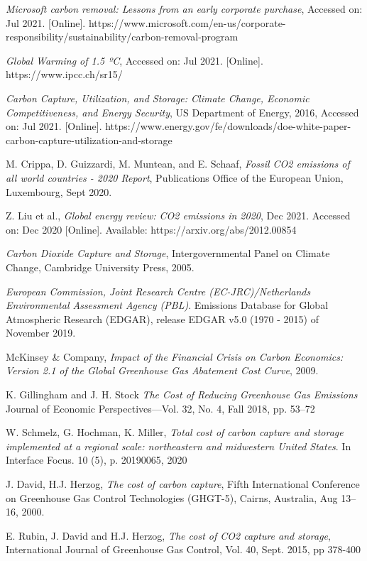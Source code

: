 \documentclass{article}
\begin{document}
\begin{thebibliography}{1}
  \textit{Microsoft carbon removal: Lessons from an early corporate purchase}, Accessed on: Jul 2021. [Online]. https://www.microsoft.com/en-us/corporate-responsibility/sustainability/carbon-removal-program

 \textit{Global Warming of 1.5 ºC}, Accessed on: Jul 2021. [Online]. https://www.ipcc.ch/sr15/

 \textit{Carbon Capture, Utilization, and Storage: Climate Change, Economic Competitiveness, and Energy Security}, US Department of Energy, 2016, Accessed on: Jul 2021. [Online]. https://www.energy.gov/fe/downloads/doe-white-paper-carbon-capture-utilization-and-storage

 M. Crippa, D. Guizzardi, M. Muntean, and E. Schaaf, \textit{Fossil CO2 emissions of all world countries - 2020 Report}, Publications Office of the European Union, Luxembourg, Sept 2020.

 Z. Liu et al.,  \textit{Global energy review: CO2 emissions in 2020}, Dec 2021. Accessed on: Dec 2020 [Online]. Available: https://arxiv.org/abs/2012.00854

 \textit{Carbon Dioxide Capture and Storage}, Intergovernmental Panel on Climate Change, Cambridge University Press, 2005.

 \textit{European Commission, Joint Research Centre (EC-JRC)/Netherlands Environmental Assessment Agency (PBL)}. Emissions Database for Global Atmospheric Research (EDGAR), release EDGAR v5.0 (1970 - 2015) of November 2019.

 McKinsey \& Company, \textit{Impact of the Financial Crisis on Carbon Economics: Version 2.1 of the Global Greenhouse Gas Abatement Cost Curve}, 2009. 

 K. Gillingham and J. H. Stock \textit{The Cost of Reducing Greenhouse Gas Emissions} Journal of Economic Perspectives—Vol. 32, No. 4, Fall 2018, pp. 53–72

 W. Schmelz, G. Hochman, K. Miller, \textit{Total cost of carbon capture and storage implemented at a regional scale: northeastern and midwestern United States}. In Interface Focus. 10 (5), p. 20190065, 2020

 J. David, H.J. Herzog, \textit{The cost of carbon capture}, Fifth International Conference on Greenhouse Gas Control Technologies (GHGT-5), Cairns, Australia, Aug 13–16, 2000.

 E. Rubin, J. David and  H.J. Herzog, \textit{The cost of CO2 capture and storage}, International Journal of Greenhouse Gas Control, Vol. 40, Sept. 2015, pp 378-400


\end{thebibliography}
\end{document}
